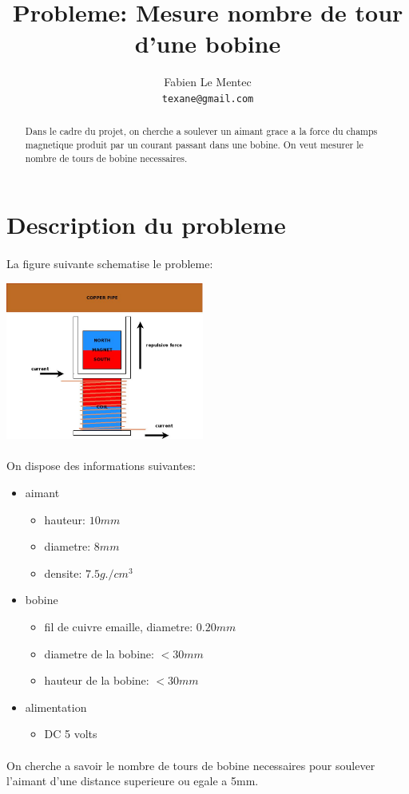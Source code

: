 \documentclass[12pt]{article}
\title{Probleme: Mesure nombre de tour d'une bobine}
\author{Fabien Le Mentec\\
\small \texttt{texane@gmail.com}
}
\date{}
\begin{document}
\maketitle

\newpage
\begin{abstract}
Dans le cadre du projet, on cherche a soulever un aimant grace a la force
du champs magnetique produit par un courant passant dans une bobine. On veut
mesurer le nombre de tours de bobine necessaires.
\end{abstract}

\newpage
\section{Description du probleme}
\paragraph{} La figure suivante schematise le probleme:
\begin{center}
  \includegraphics[keepaspectratio=true, width=65mm]{dia/coil/coil.jpg}\\
\end{center}

\paragraph{} On dispose des informations suivantes:
\begin{itemize}
  \item aimant
    \begin{itemize}
    \item hauteur: $10mm$
    \item diametre: $8mm$
    \item densite: $7.5g./cm^{3}$
    \end{itemize}

  \item bobine
    \begin{itemize}
    \item fil de cuivre emaille, diametre: $0.20mm$
    \item diametre de la bobine: $< 30mm$
    \item hauteur de la bobine: $< 30mm$
    \end{itemize}  

  \item alimentation
    \begin{itemize}
    \item DC 5 volts
    \end{itemize}
\end{itemize}

\paragraph{} On cherche a savoir le nombre de tours de bobine necessaires
pour soulever l'aimant d'une distance superieure ou egale a 5mm.
\end{document}
